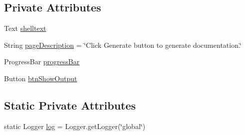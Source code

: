 \subsection*{Private Attributes}
\begin{DoxyCompactItemize}
\item 
Text \hyperlink{classit_1_1isislab_1_1masonassisteddocumentation_1_1mason_1_1wizards_1_1_q___end_wizard_ac5e6042df131960cc6061862b2a7b8ce}{shelltext}
\item 
String \hyperlink{classit_1_1isislab_1_1masonassisteddocumentation_1_1mason_1_1wizards_1_1_q___end_wizard_a919473d7653dd931027f0f70f0c732ef}{page\-Description} = \char`\"{}Click Generate button to generate documentation.\char`\"{}
\item 
Progress\-Bar \hyperlink{classit_1_1isislab_1_1masonassisteddocumentation_1_1mason_1_1wizards_1_1_q___end_wizard_afe3af585753c6f0c523146360faa433c}{progress\-Bar}
\item 
Button \hyperlink{classit_1_1isislab_1_1masonassisteddocumentation_1_1mason_1_1wizards_1_1_q___end_wizard_ae2da7cbfbfd8b618427f5d7fa356a8a5}{btn\-Show\-Output}
\end{DoxyCompactItemize}
\subsection*{Static Private Attributes}
\begin{DoxyCompactItemize}
\item 
static Logger \hyperlink{classit_1_1isislab_1_1masonassisteddocumentation_1_1mason_1_1wizards_1_1_q___end_wizard_a4c601ca2e543770e68e5173919d7a50c}{log} = Logger.\-get\-Logger(\char`\"{}global\char`\"{})
\end{DoxyCompactItemize}


